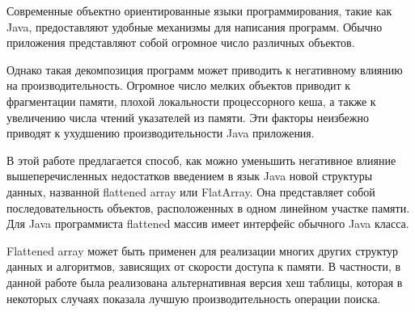 Современные объектно ориентированные языки программирования, такие как Java, предоставляют удобные механизмы для написания программ. Обычно приложения представляют собой огромное число различных объектов. 
\par
Однако такая декомпозиция программ может приводить к негативному влиянию на производительность. Огромное число мелких объектов приводит к фрагментации памяти, плохой локальности процессорного кеша, а также к увеличению числа чтений указателей из памяти. Эти факторы неизбежно приводят к ухудшению производительности Java приложения.
\par
В этой работе предлагается способ, как можно уменьшить негативное влияние вышеперечисленных недостатков введением в язык Java новой структуры данных, названной flattened array или FlatArray. Она представляет собой последовательность объектов, расположенных в одном линейном участке памяти. 
Для Java программиста flattened массив имеет интерфейс обычного Java класса.
\par
Flattened array может быть применен для реализации многих других структур данных и алгоритмов, зависящих от скорости доступа к памяти. В частности, в данной работе была реализована альтернативная версия хеш таблицы, которая в некоторых случаях показала лучшую производительность операции поиска.
\clearpage

